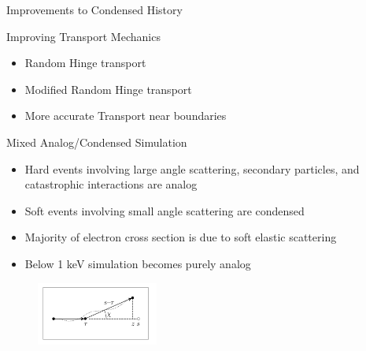 \documentclass{beamer}
\begin{document}
  \begin{frame}{Improvements to Condensed History}

  \begin{block}{Improving Transport Mechanics}

    \begin{itemize}
      \item Random Hinge transport 
      \item Modified Random Hinge transport
      \item More accurate Transport near boundaries
    \end{itemize}
  
  \end{block}
    
  \begin{block}{Mixed Analog/Condensed Simulation}
    \begin{itemize}
      \item Hard events involving large angle scattering, secondary particles, and
catastrophic interactions are analog
      \item Soft events involving small angle scattering are condensed
      \item Majority of electron cross section is due to soft elastic scattering
      \item Below 1 keV simulation becomes purely analog
    \end{itemize}    
  \end{block}  
    
    \begin{figure}
     \includegraphics[width=40mm]{random_hinge.png}
   \end{figure}
\end{frame}
\end{document}

